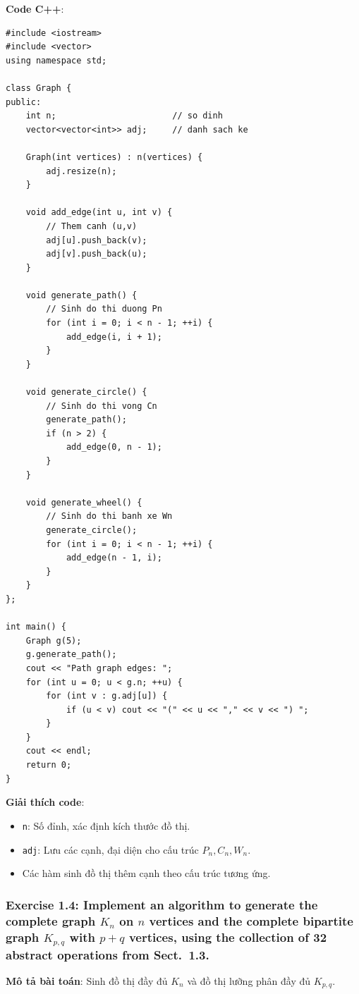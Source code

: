 \documentclass[a4paper,12pt]{article}
\begin{document}
\bigskip
\textbf{Code C++}:
\lstset{language=C++}
\begin{lstlisting}
#include <iostream>
#include <vector>
using namespace std;

class Graph {
public:
    int n;                       // so dinh
    vector<vector<int>> adj;     // danh sach ke

    Graph(int vertices) : n(vertices) {
        adj.resize(n);
    }

    void add_edge(int u, int v) {
        // Them canh (u,v)
        adj[u].push_back(v);
        adj[v].push_back(u);
    }

    void generate_path() {
        // Sinh do thi duong Pn
        for (int i = 0; i < n - 1; ++i) {
            add_edge(i, i + 1);
        }
    }

    void generate_circle() {
        // Sinh do thi vong Cn
        generate_path();
        if (n > 2) {
            add_edge(0, n - 1);
        }
    }

    void generate_wheel() {
        // Sinh do thi banh xe Wn
        generate_circle();
        for (int i = 0; i < n - 1; ++i) {
            add_edge(n - 1, i);
        }
    }
};

int main() {
    Graph g(5);
    g.generate_path();
    cout << "Path graph edges: ";
    for (int u = 0; u < g.n; ++u) {
        for (int v : g.adj[u]) {
            if (u < v) cout << "(" << u << "," << v << ") ";
        }
    }
    cout << endl;
    return 0;
}
\end{lstlisting}

\textbf{Giải thích code}:
\begin{itemize}
    \item \texttt{n}: Số đỉnh, xác định kích thước đồ thị.
    \item \texttt{adj}: Lưu các cạnh, đại diện cho cấu trúc \( P_n, C_n, W_n \).
    \item Các hàm sinh đồ thị thêm cạnh theo cấu trúc tương ứng.
\end{itemize}

\subsubsection{Exercise 1.4: Implement an algorithm to generate the complete graph $K_n$ on $n$ vertices and the complete bipartite graph $K_{p,q}$ with $p + q$ vertices, using the collection of 32 abstract operations from Sect.~1.3.}
\textbf{Mô tả bài toán}: Sinh đồ thị đầy đủ \( K_n \) và đồ thị lưỡng phân đầy đủ \( K_{p,q} \).
\end{document}

